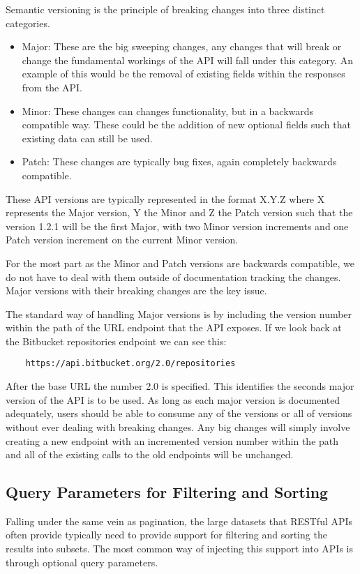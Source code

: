 Semantic versioning is the principle of breaking changes into three distinct categories.
\begin{itemize}
    \item Major: These are the big sweeping changes, any changes that will break or change the fundamental workings of the API will fall under this category. An example of this would be the removal of existing fields within the responses from the API.
    \item Minor: These changes can changes functionality, but in a backwards compatible way. These could be the addition of new optional fields such that existing data can still be used. 
    \item Patch: These changes are typically bug fixes, again completely backwards compatible.
\end{itemize}
These API versions are typically represented in the format X.Y.Z where X represents the Major version, Y the Minor and Z the Patch version such that the version 1.2.1 will be the first Major, with two Minor version increments and one Patch version increment on the current Minor version.

For the most part as the Minor and Patch versions are backwards compatible, we do not have to deal with them outside of documentation tracking the changes. Major versions with their breaking changes are the key issue.

The standard way of handling Major versions is by including the version number within the path of the URL endpoint that the API exposes. If we look back at the Bitbucket repositories endpoint we can see this:
\begin{verbatim}
    https://api.bitbucket.org/2.0/repositories
\end{verbatim}
After the base URL the number 2.0 is specified. This identifies the seconds major version of the API is to be used. As long as each major version is documented adequately, users should be able to consume any of the versions or all of versions without ever dealing with breaking changes. Any big changes will simply involve creating a new endpoint with an incremented version number within the path and all of the existing calls to the old endpoints will be unchanged.
\subsection{Query Parameters for Filtering and Sorting}
Falling under the same vein as pagination, the large datasets that RESTful APIs often provide typically need to provide support for filtering and sorting the results into subsets. The most common way of injecting this support into APIs is through optional query parameters.


